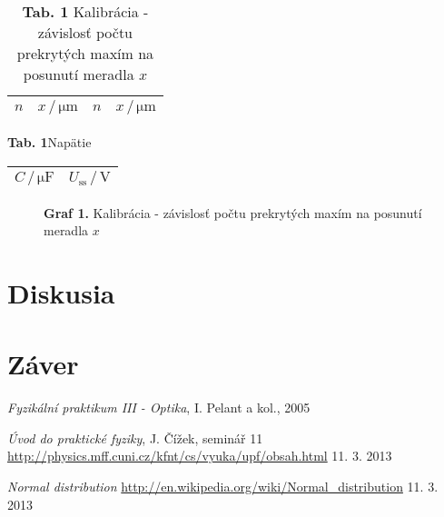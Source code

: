 \documentclass[a4paper, 10pt]{article}
\newcommand{\unit}[1]{\ensuremath{\, \mathrm{#1}}}
\begin{document}
\begin{table}[h!]
\centering
\hspace*{60pt}
\begin{tabular}{r|r||r|r}
$ n $ & 
$ x\,/\unit{\mu m}$ &
$ n$ & 
$ x\,/\unit{\mu m}$ 
\\
\midrule 
%
\end{tabular}
\newline
\vspace*{2pt}
\caption*{\textbf{ Tab. 1} Kalibrácia - závislosť počtu \\prekrytých maxím na posunutí meradla $x$}
\end{table}

\begin{wraptable}[25]{r|r}[10pt]{3cm}
\vspace*{-30pt}
\textbf{ Tab. 1}\newline Napätie
\newline
\begin{tabular}{r|r}
$ C\, / \unit {\mu F}$ & $U_\mathrm{ss} \, / \unit {V}$ \\
\midrule 
%
\end{tabular}
\end{wraptable}


\begin{figure}[h!]
\centering
\vspace*{-15pt}
%
\textbf{Graf 1.} Kalibrácia - závislosť počtu prekrytých maxím na posunutí meradla $x$
\end{figure}

\section*{Diskusia}

\section*{Záver}


\begin{thebibliography}{9}

    \emph{Fyzikální praktikum III - Optika}, I. Pelant a kol., 2005

    \emph{Úvod do praktické fyziky}, J. Čížek, seminář 11
    \url{http://physics.mff.cuni.cz/kfnt/cs/vyuka/upf/obsah.html} 11. 3. 2013

    \emph{Normal distribution}
    \url{http://en.wikipedia.org/wiki/Normal_distribution} 11. 3. 2013

\end{thebibliography}
\end{document}
